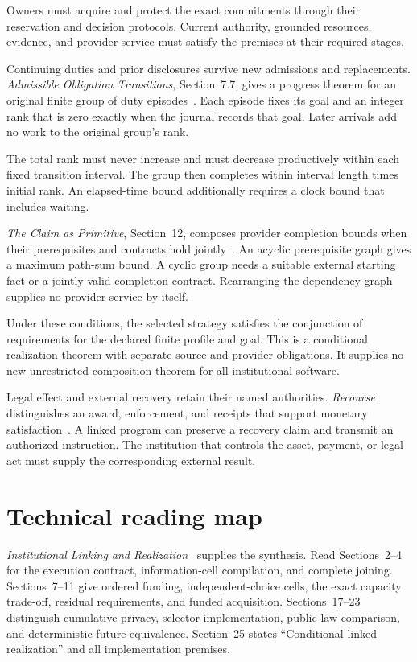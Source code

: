 \documentclass{momentum}
\begin{document}
Owners must acquire and protect the exact commitments through their reservation and decision protocols.
Current authority, grounded resources, evidence, and provider service must satisfy the premises at their required stages.

Continuing duties and prior disclosures survive new admissions and replacements.
\emph{Admissible Obligation Transitions}, Section~7.7, gives a progress theorem for an original finite group of duty episodes~\cite{transitions}.
Each episode fixes its goal and an integer rank that is zero exactly when the journal records that goal.
Later arrivals add no work to the original group's rank.

The total rank must never increase and must decrease productively within each fixed transition interval. The group then completes within interval length times initial rank.
An elapsed-time bound additionally requires a clock bound that includes waiting.

\emph{The Claim as Primitive}, Section~12, composes provider completion bounds when their prerequisites and contracts hold jointly~\cite{claim}.
An acyclic prerequisite graph gives a maximum path-sum bound.
A cyclic group needs a suitable external starting fact or a jointly valid completion contract.
Rearranging the dependency graph supplies no provider service by itself.

Under these conditions, the selected strategy satisfies the conjunction of requirements for the declared finite profile and goal.
This is a conditional realization theorem with separate source and provider obligations.
It supplies no new unrestricted composition theorem for all institutional software.

Legal effect and external recovery retain their named authorities.
\emph{Recourse} distinguishes an award, enforcement, and receipts that support monetary satisfaction~\cite{recourse}.
A linked program can preserve a recovery claim and transmit an authorized instruction.
The institution that controls the asset, payment, or legal act must supply the corresponding external result.

\section{Technical reading map}
\label{sec:reading-map}

\emph{Institutional Linking and Realization}~\cite{linking} supplies the synthesis.
Read Sections~2--4 for the execution contract, information-cell compilation, and complete joining.
Sections~7--11 give ordered funding, independent-choice cells, the exact capacity trade-off, residual requirements, and funded acquisition.
Sections~17--23 distinguish cumulative privacy, selector implementation, public-law comparison, and deterministic future equivalence.
Section~25 states ``Conditional linked realization'' and all implementation premises.
\end{document}
